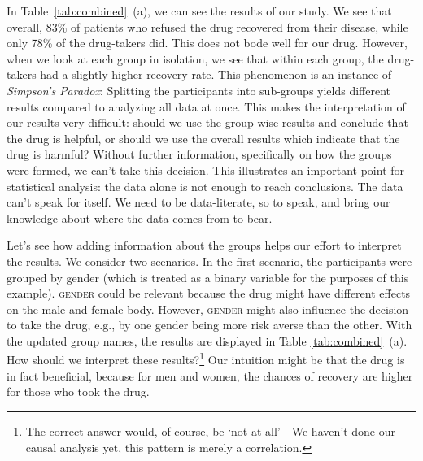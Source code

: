 \documentclass[nobib]{tufte-handout}
\begin{document}
In Table~\ref{tab:combined}~(a), we can see the results of our study.
We see that overall, 83\% of patients who refused the drug recovered from their disease, while only 78\% of the drug-takers did. 
This does not bode well for our drug.
However, when we look at each group in isolation, we see that within each group, the drug-takers had a slightly higher recovery rate.
This phenomenon is an instance of \textit{Simpson's Paradox}: Splitting the participants into sub-groups yields different results compared to analyzing all data at once.
This makes the interpretation of our results very difficult: should we use the group-wise results and conclude that the drug is helpful, or should we use the overall results which indicate that the drug is harmful? 
Without further information, specifically on how the groups were formed, we can't take this decision.
This illustrates an important point for statistical analysis: the data alone is not enough to reach conclusions.
The data can't speak for itself. 
We need to be data-literate, so to speak, and bring our knowledge about where the data comes from to bear.

Let's see how adding information about the groups helps our effort to interpret the results. 
We consider two scenarios.
In the first scenario, the participants were grouped by gender (which is treated as a binary variable for the purposes of this example).
\textsc{gender} could be relevant because the drug might have different effects on the male and female body. 
However, \textsc{gender} might also influence the decision to take the drug, e.g., by one gender being more risk averse than the other. 
With the updated group names, the results are displayed in Table \ref{tab:combined}~(a).
How should we interpret these results?\footnote{The correct answer would, of course, be `not at all' - We haven't done our causal analysis yet, this pattern is merely a correlation.}
Our intuition might be that the drug is in fact beneficial, because for men and women, the chances of recovery are higher for those who took the drug.
\end{document}
